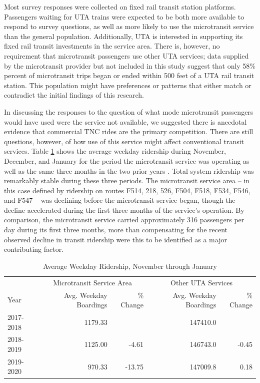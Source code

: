 \documentclass[smartcities,article,submit,moreauthors,pdftex]{mdpi}
\begin{document}
Most survey responses were collected on fixed rail transit station platforms.
Passengers waiting for UTA trains were expected to be both more available to
respond to survey questions, as well as more likely to use the microtransit
service than the general population. Additionally, UTA is interested in
supporting its fixed rail transit investments in the service area. There is,
however, no requirement that microtransit passengers use other UTA services;
data supplied by the microtransit provider but not included in this study
suggest that only 58\% percent of microtransit trips began or ended within 500
feet of a UTA rail transit station. This population might have preferences or
patterns that either match or contradict the initial findings of this research.

In discussing the responses to the question of what mode microtransit passengers
would have used were the service not available, we suggested there is anecdotal
evidence that commercial TNC rides are the primary competition. There are still
questions, however, of how use of this service might affect conventional transit
services. Table \ref{tab:uta-ridership} shows the average weekday ridership
during November, December, and January for the period the microtransit service
was operating as well as the same three months in the two prior years
\citet{uta2020boardings}. Total system ridership was remarkably stable during
these three periods. The microtransit service area -- in this case defined by
ridership on routes F514, 218, 526, F504, F518, F534, F546, and F547 -- was
declining before the microtransit service began, though the decline accelerated
during the first three months of the service's operation. By comparison, the
microtransit service carried approximately 316 passengers per day during its
first three months, more than compensating for the recent observed decline in
transit ridership were this to be identified as a major contributing factor.

\begin{table}

\caption{\label{tab:uta-ridership}Average Weekday Ridership, November through January}
\centering
\begin{tabular}[t]{lrrrr}
\toprule
\multicolumn{1}{c}{ } & \multicolumn{2}{c}{Microtransit Service Area} & \multicolumn{2}{c}{Other UTA Services} \\
\cmidrule(l{3pt}r{3pt}){2-3} \cmidrule(l{3pt}r{3pt}){4-5}
Year & Avg. Weekday Boardings & \% Change & Avg. Weekday Boardings & \% Change\\
\midrule
2017-2018 & 1179.33 &  & 147410.0 & \\
2018-2019 & 1125.00 & -4.61 & 146743.0 & -0.45\\
2019-2020 & 970.33 & -13.75 & 147009.8 & 0.18\\
\bottomrule
\end{tabular}
\end{table}
\end{document}
